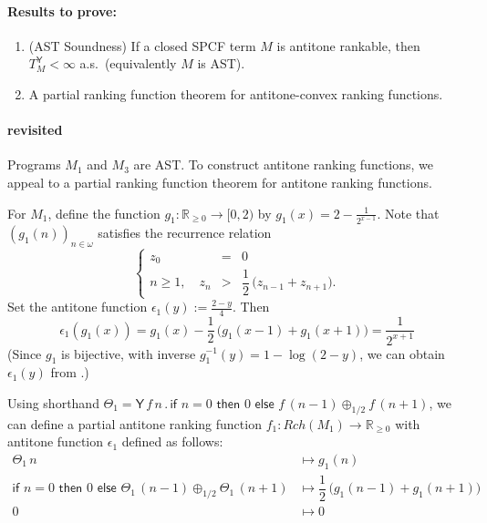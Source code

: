 \documentclass{article}
\newcommand{\Real}{\mathbb{R}}
\newcommand{\nnReal}{\mathbb{R}_{{\geq}0}}
\newcommand{\tY}{\textsf{Y}}
\newcommand{\tif}[3]{\textsf{if }#1\textsf{ then }#2\textsf{ else }#3}
\theoremstyle{definition}
\theoremstyle{lemma}
\theoremstyle{remark}
\begin{document}
\paragraph{Results to prove:}
\begin{enumerate}
\item (AST Soundness) If a closed SPCF term $M$ is antitone rankable, then $T^{\tY}_M < \infty$ a.s.~(equivalently $M$ is AST). 

\item A partial ranking function theorem for antitone-convex ranking functions. 
\end{enumerate}

\paragraph{ revisited}

Programs $M_1$ and $M_3$ are AST.
To construct antitone ranking functions, we appeal  to a partial ranking function theorem for antitone ranking functions.

For $M_1$, define the function $g_1 : \nnReal \to [0, 2)$ by $g_1(x) = 2 - \frac{1}{2^{x-1}}$.
Note that $(g_1 (n))_{n \in \omega}$ satisfies the recurrence relation
\[
\left\{
\begin{array}{rll}
z_0 &=& 0\\
n \geq 1, \quad z_n &>& \dfrac{1}{2} \, \big( z_{n-1} + z_{n+1}\big).
\end{array}
\right.
\]
Set the antitone function $\epsilon_1 (y) :=  \frac{2-y}{4}$.
Then
\begin{equation}
\epsilon_1(g_1(x)) = g_1(x) - \dfrac{1}{2} \, \big(g_1(x-1) + g_1(x+1)\big) = \dfrac{1}{2^{x+1}}
\label{eqn:epsilon g M1}
\end{equation}
(Since $g_1$ is bijective, with inverse $g_1^{-1}(y) = 1 - \log (2-y)$, we can obtain $\epsilon_1(y)$ from .) 

Using shorthand 
$\Theta_1 = \tY \, f \, n \, . \, 
\tif{n = 0}{0}{f \, (n - 1) \oplus_{1/2} f \, (n + 1)}$, 
we can define a partial antitone ranking function $f_1 : \mathit{Rch}(M_1) \to \nnReal$ with antitone function $\epsilon_1$ defined as follows:
\begin{align*}
{\Theta_1} \, n 
&\mapsto 
g_1(n)
\\
\tif{n = 0}{0}{\Theta_1 \, (n - 1) \oplus_{1/2} \Theta_1 \, (n + 1)}
&\mapsto
\dfrac{1}{2} \, \big(g_1(n-1) + g_1(n+1)\big)
\\
0 &\mapsto 0
\end{align*}
\end{document}
